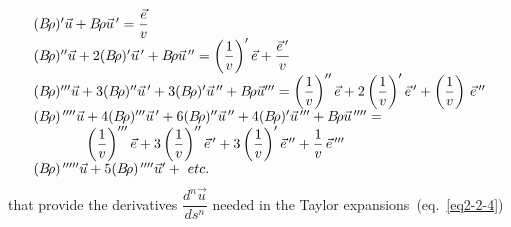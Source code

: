\begin{equation}
	\begin{array}{l}
		(\Br )^\prime\vec  u + \Br\vec  u^{\,\prime}   = \dfrac{\vec e}{ v}\\
		 (\Br )^{\prime\prime}\vec  u + 2 (\Br)^\prime \vec  u^{\,\prime} 
		     +\Br\vec  u^{\,\prime\prime}   = \left(\dfrac{1}{v}\right)^\prime\vec  e 
		         + \dfrac{\vec  e^{\,\prime}}{v} \\
		(\Br)^{\prime\prime\prime}\vec  u + 3(\Br)^{\prime\prime}\vec  u^{\,\prime}
		      + 3(\Br)^\prime \vec  u^{\,\prime\prime} 
		      +\Br\vec  u^{\prime\prime\prime}   =
		      \left(\dfrac{1}{ v}\right)^{\prime\prime}\vec  e +
		      2\left( \dfrac{1}{v}\right)^\prime \vec  e^{\,\prime} 
		      +\left(\dfrac{1}{v}\right)\, \vec  e^{\,\prime\prime}\\
		(\Br )^{\quaprime} \vec u + 4(\Br)^{\prime\prime\prime} \vec  u^{\,\prime} 
		      + 6(\Br)^{\prime\prime}\vec  u^{\,\prime\prime} 
		      +4 (\Br)^\prime\vec  u^{\,\prime\prime\prime} 
		      +\Br\vec  u^{\quaprime} = \\
		\hphantom{(\Br )^{\quaprime} \vec u}
		\left(\dfrac{1}{v}\right)^{\prime\prime\prime}\vec e
		      +3\left(\dfrac{1}{v}\right)^{\prime\prime}\vec  e^{\,\prime} 
		      +3\left(\dfrac{1}{ v}\right)^\prime\vec e^{\,\prime\prime} +
		      \dfrac{1}{v} \,\vec  e^{\,\prime\prime\prime}  \\
	    (\Br )^{\quaprime\prime} \vec u  +  5 (\Br )^{\quaprime} \vec u^{\prime}  + ~ etc.	
             \end{array}
	\label{eq2-2-9}
\end{equation} 
%
that provide the derivatives $ \dfrac{d^n\vec  u}{ds^n}$ needed in the Taylor 
expansions~(eq.~\ref{eq2-2-4})
%
